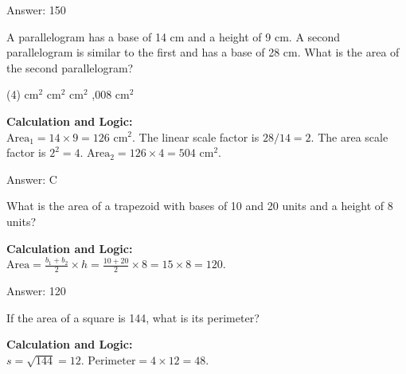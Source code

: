 \documentclass[11pt,paper=a4,answers]{exam}
\begin{document}
\begin{questions}
\begin{solution}
Answer: \colorbox{yellow!100}{150}
\end{solution}

\vspace{60pt}

\question
A parallelogram has a base of 14 cm and a height of 9 cm. A second parallelogram is similar to the first and has a base of 28 cm. What is the area of the second parallelogram?
\begin{tasks}(4)
     $\text{cm}^2$
     $\text{cm}^2$
     $\text{cm}^2$
    ,008 $\text{cm}^2$
\end{tasks}

\begin{solution}
\textbf{Calculation and Logic:} \\
$\text{Area}_1 = 14 \times 9 = 126 \text{ cm}^2$. The linear scale factor is $28/14 = 2$. The area scale factor is $2^2 = 4$. $\text{Area}_2 = 126 \times 4 = 504 \text{ cm}^2$.

\vspace{30pt}

Answer: \colorbox{yellow!100}{C}
\end{solution}

\vspace{60pt}

\question
What is the area of a trapezoid with bases of 10 and 20 units and a height of 8 units?

\begin{solution}
\textbf{Calculation and Logic:} \\
$\text{Area} = \frac{b_1 + b_2}{2} \times h = \frac{10 + 20}{2} \times 8 = 15 \times 8 = 120$.

\vspace{30pt}

Answer: \colorbox{yellow!100}{120}
\end{solution}

\vspace{60pt}

\question
If the area of a square is 144, what is its perimeter?

\begin{solution}
\textbf{Calculation and Logic:} \\
$s = \sqrt{144} = 12$. $\text{Perimeter} = 4 \times 12 = 48$.


\end{solution}
\end{questions}
\end{document}
